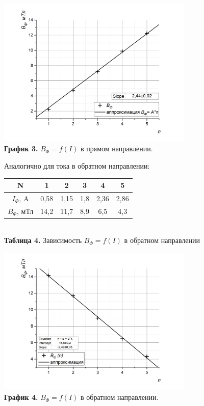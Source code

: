 \documentclass{article}
\begin{document}
\begin{center}
    \includegraphics[width = 0.7\textwidth]{images/image4.png}\\
    \textbf{График 3.} $B_{\Phi} = f(I)$ в прямом направлении.
\end{center}

Аналогично для тока в обратном направлении:

\begin{center}
    \begin{tabular}{|c|c|c|c|c|c|}
    \hline
    N   &   1   &   2   &   3   &   4   &   5  \\ \hline
    \(I_{\Phi}\), A & 0,58 & 1,15 & 1,8 & 2,36 & 2,86 \\    \hline
    \(B_{\Phi}\), мТл & 14,2 & 11,7 & 8,9 & 6,5 & 4,3 \\   \hline
    \end{tabular}
    \\
    \textbf{Таблица 4.} Зависимость \(B_{\Phi} = f(I)\) в обратном направлении
\end{center}

\begin{center}
    \includegraphics[width = 0.7\textwidth]{images/image5.png}\\
    \textbf{График 4.} $B_{\Phi} = f(I)$ в обратном направлении.
\end{center}
\end{document}
